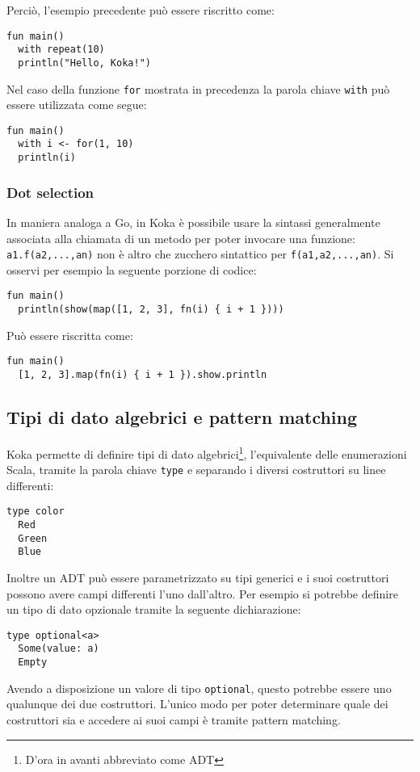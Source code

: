 Perciò, l'esempio precedente può essere riscritto come:
\begin{lstlisting}[language=koka]
fun main()
  with repeat(10)
  println("Hello, Koka!")
\end{lstlisting}

Nel caso della funzione \lstinline{for} mostrata in precedenza la parola chiave \lstinline{with} può essere utilizzata come segue:
\begin{lstlisting}[language=koka]
fun main()
  with i <- for(1, 10)
  println(i)
\end{lstlisting}

\subsubsection{Dot selection}
In maniera analoga a Go, in Koka è possibile usare la sintassi generalmente associata alla chiamata di un metodo per poter invocare una funzione: \lstinline{a1.f(a2,...,an)} non è altro che zucchero sintattico per \lstinline{f(a1,a2,...,an)}.
Si osservi per esempio la seguente porzione di codice:
\begin{lstlisting}[language=koka]
fun main()
  println(show(map([1, 2, 3], fn(i) { i + 1 })))
\end{lstlisting}
Può essere riscritta come:
\begin{lstlisting}[language=koka]
fun main()
  [1, 2, 3].map(fn(i) { i + 1 }).show.println
\end{lstlisting}

\subsection{Tipi di dato algebrici e pattern matching}
Koka permette di definire tipi di dato algebrici\footnote{D'ora in avanti abbreviato come ADT}, l'equivalente delle enumerazioni Scala, tramite la parola chiave \lstinline{type} e separando i diversi costruttori su linee differenti:
\begin{lstlisting}[language=koka]
type color
  Red
  Green
  Blue
\end{lstlisting}
Inoltre un ADT può essere parametrizzato su tipi generici e i suoi costruttori possono avere campi differenti l'uno dall'altro. Per esempio si potrebbe definire un tipo di dato opzionale tramite la seguente dichiarazione:
\begin{lstlisting}[language=koka]
type optional<a>
  Some(value: a)
  Empty
\end{lstlisting}
Avendo a disposizione un valore di tipo \lstinline{optional}, questo potrebbe essere uno qualunque dei due costruttori. L'unico modo per poter determinare quale dei costruttori sia e accedere ai suoi campi è tramite pattern matching.

